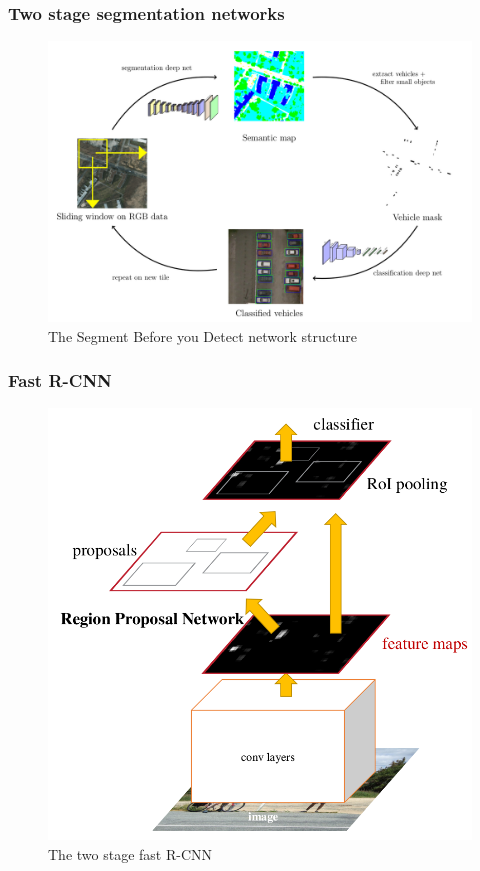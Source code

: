 \documentclass[aspectratio=1610]{beamer}
\begin{document}
\begin{frame}
\frametitle{\hfill Two stage segmentation networks}
\begin{figure}[h!]
\centering
      \includegraphics[scale=0.18]{SBD_net}
\caption{The Segment Before you Detect network structure} \label{fig:SBD}
\end{figure}
\end{frame}



\begin{frame}
  \frametitle{\hfill Fast R-CNN}
\begin{figure}[h!]
\centering
      \includegraphics[scale=0.18]{r-cnn}
\caption{The two stage fast R-CNN} \label{fig:SBD}
\end{figure}
\end{frame}
\end{document}
